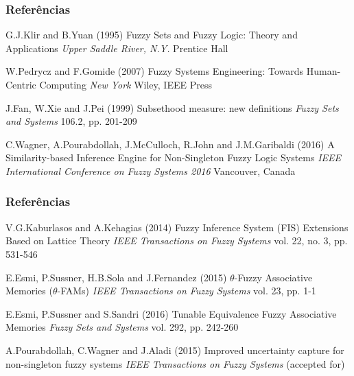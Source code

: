 \documentclass{beamer}
\theoremstyle{definition}
\begin{document}
\begin{frame}
\frametitle{Referências}
\footnotesize{
\begin{thebibliography}{99} %
 G.J.Klir and B.Yuan (1995)
\newblock Fuzzy Sets and Fuzzy Logic: Theory and Applications
\newblock \emph{Upper Saddle River, N.Y.} Prentice Hall

 W.Pedrycz and F.Gomide (2007)
\newblock Fuzzy Systems Engineering: Towards Human-Centric Computing
\newblock \emph{New York} Wiley, IEEE Press

 J.Fan, W.Xie and J.Pei (1999)
\newblock Subsethood measure: new definitions
\newblock \emph{Fuzzy Sets and Systems} 106.2, pp. 201-209

 C.Wagner, A.Pourabdollah, J.McCulloch, R.John and J.M.Garibaldi (2016)
\newblock A Similarity-based Inference Engine for Non-Singleton Fuzzy Logic Systems
\newblock \emph{IEEE International Conference on Fuzzy Systems 2016} Vancouver, Canada
\end{thebibliography}
}
\end{frame}

\begin{frame}
\frametitle{Referências}
\footnotesize{
\begin{thebibliography}{99} %
 V.G.Kaburlasos and A.Kehagias (2014)
\newblock Fuzzy Inference System (FIS) Extensions Based on Lattice Theory
\newblock \emph{IEEE Transactions on Fuzzy Systems} vol. 22, no. 3, pp. 531-546

 E.Esmi, P.Sussner, H.B.Sola and J.Fernandez (2015)
\newblock $\theta$-Fuzzy Associative Memories ($\theta$-FAMs)
\newblock \emph{IEEE Transactions on Fuzzy Systems} vol. 23, pp. 1-1

 E.Esmi, P.Sussner and S.Sandri (2016)
\newblock Tunable Equivalence Fuzzy Associative Memories
\newblock \emph{Fuzzy Sets and Systems} vol. 292, pp. 242-260

 A.Pourabdollah, C.Wagner and J.Aladi (2015)
\newblock Improved uncertainty capture for non-singleton fuzzy systems
\newblock \emph{IEEE Transactions on Fuzzy Systems} (accepted for)
\end{thebibliography}
}
\end{frame}
\end{document}

